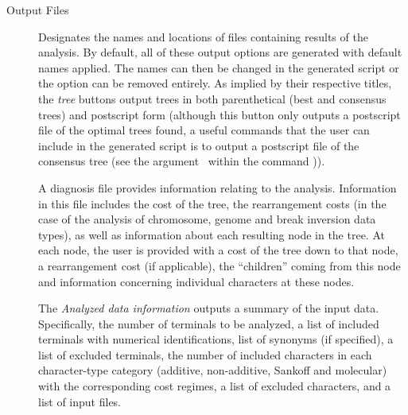 \begin{description}
        \item[Output Files]
        		Designates the names and locations of files containing results of the analysis. 
        		By default, all of these output options are generated with default names applied.  The names can 
      		then be changed in the generated script or the option can be removed entirely.  As implied by their 
        		respective titles, the \emph{tree} buttons output trees in both parenthetical (best and 
        		consensus trees) and postscript form (although this button only outputs a postscript file of the optimal trees
		found, a useful commands that the user can include in the generated script is to output 
		a postscript file of the consensus tree (see the argument~ 
		within the command )). 
        
        		\indent A diagnosis file provides information relating to the analysis. Information in this file includes 
		the cost of the tree, the rearrangement costs (in the case of the analysis of chromosome, genome and 
		break inversion data types), as well as information about each resulting node in the tree.  At each node, 
		the user is provided with a cost of the tree down to that node, a rearrangement cost (if applicable), the ``children'' 
		coming from this node and information concerning individual characters at these nodes.
		
		\indent The \emph{Analyzed data information} outputs a summary of the input data. Specifically, 
		the number of terminals to be analyzed, a list of included terminals with numerical identifications, 
		list of synonyms (if specified), a list of excluded terminals, the number of included characters in each 
		character-type category (additive, non-additive, Sankoff and molecular) with the corresponding cost 
		regimes, a list of excluded characters, and a list of input files.    
\end{description}

